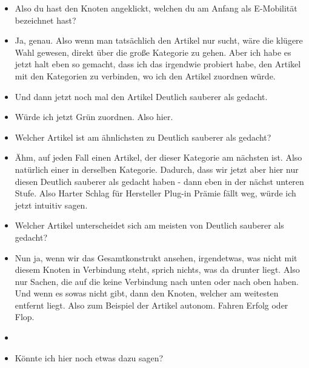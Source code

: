 {\begin{itemize}[]
                  Nö, eben nicht.
                  Unlucky.
                  Also ich wollte es jetzt so spezifisch wie möglich machen.
                  Ich könnte natürlich auch hier lang, also den Knoten anklicken und dann schauen, wo der Artikel ist.
            \item {} Also du hast den Knoten angeklickt, welchen du am Anfang als E-Mobilität bezeichnet hast?
            \item {} Ja, genau.
                  Also wenn man tatsächlich den Artikel nur sucht, wäre die klügere Wahl gewesen, direkt über die große Kategorie zu gehen.
                  Aber ich habe es jetzt halt eben so gemacht, dass ich das irgendwie probiert habe, den Artikel mit den Kategorien zu verbinden, wo ich den Artikel zuordnen würde.
            \item {} Und dann jetzt noch mal den Artikel \flqq Deutlich sauberer als gedacht\frqq{}.
            \item {} Würde ich jetzt Grün zuordnen. Also hier.
            \item {} Welcher Artikel ist am ähnlichsten zu \flqq Deutlich sauberer als gedacht\frqq{}?
            \item {} Ähm, auf jeden Fall einen Artikel, der dieser Kategorie am nächsten ist.
                  Also natürlich einer in derselben Kategorie.
                  Dadurch, dass wir jetzt aber hier nur diesen \flqq Deutlich sauberer als gedacht\frqq{} haben - dann eben in der nächst unteren Stufe.
                  Also \flqq Harter Schlag für Hersteller Plug-in Prämie fällt weg\frqq{}, würde ich jetzt intuitiv sagen.
            \item {} Welcher Artikel unterscheidet sich am meisten von \flqq Deutlich sauberer als gedacht\frqq{}?
            \item {} Nun ja, wenn wir das Gesamtkonstrukt ansehen, irgendetwas, was nicht mit diesem Knoten in Verbindung steht, sprich nichts, was da drunter liegt.
                  Also nur Sachen, die auf die keine Verbindung nach unten oder nach oben haben.
                  Und wenn es sowas nicht gibt, dann den Knoten, welcher am weitesten entfernt liegt.
                  Also zum Beispiel der Artikel \flqq autonom. Fahren Erfolg oder Flop\frqq{}.
            \item {}
            \item {} Könnte ich hier noch etwas dazu sagen?

\end{itemize}}
